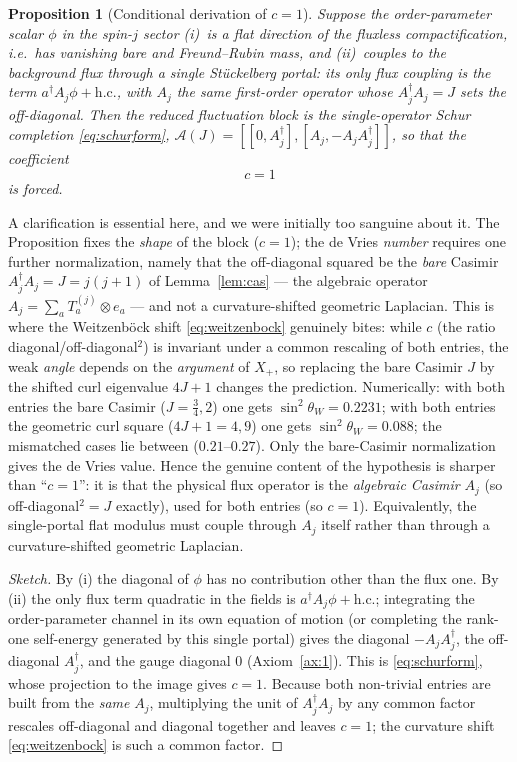 \documentclass[11pt]{article}
\theoremstyle{plain}
\newtheorem{proposition}[theorem]{Proposition}
\theoremstyle{definition}
\newcommand{\cA}{\mathcal{A}}
\newcommand{\sinsq}{\sin^{2}\theta_W}
\begin{document}
\begin{proposition}[Conditional derivation of $c=1$]
\label{prop:cone}
Suppose the order-parameter scalar $\phi$ in the spin-$j$ sector
(i)~is a flat direction of the fluxless compactification, i.e.\ has vanishing
bare and Freund--Rubin mass, and
(ii)~couples to the background flux through a single Stückelberg portal: its
only flux coupling is the term $a^\dagger A_j\phi+\mathrm{h.c.}$, with $A_j$
the same first-order operator whose $A_j^\dagger A_j=J$ sets the off-diagonal.
Then the reduced fluctuation block is the single-operator Schur completion
\eqref{eq:schurform}, $\cA(J)=[[0,A_j^\dagger],[A_j,-A_jA_j^\dagger]]$, so that
the coefficient
\begin{equation}
\boxed{\;c=1\;}
\end{equation}
is forced.
\end{proposition}
A clarification is essential here, and we were initially too sanguine about
it. The Proposition fixes the \emph{shape} of the block ($c=1$); the de Vries
\emph{number} requires one further normalization, namely that the off-diagonal
squared be the \emph{bare} Casimir $A_j^\dagger A_j=J=j(j+1)$ of
Lemma~\ref{lem:cas} --- the algebraic operator $A_j=\sum_aT_a^{(j)}\otimes e_a$
--- and not a curvature-shifted geometric Laplacian. This is where the
Weitzenb\"ock shift \eqref{eq:weitzenbock} genuinely bites: while $c$ (the
ratio diagonal/off-diagonal$^2$) is invariant under a common rescaling of both
entries, the weak \emph{angle} depends on the \emph{argument} of $X_+$, so
replacing the bare Casimir $J$ by the shifted curl eigenvalue $4J+1$ changes
the prediction. Numerically: with both entries the bare Casimir
($J=\tfrac34,2$) one gets $\sinsq=0.2231$; with both entries the geometric
curl square ($4J+1=4,9$) one gets $\sinsq=0.088$; the mismatched cases lie
between ($0.21$--$0.27$). Only the bare-Casimir normalization gives the de
Vries value. Hence the genuine content of the hypothesis is sharper than
``$c=1$'': it is that the physical flux operator is the \emph{algebraic
Casimir} $A_j$ (so off-diagonal$^2=J$ exactly), used for both entries
(so $c=1$). Equivalently, the single-portal flat modulus must couple through
$A_j$ itself rather than through a curvature-shifted geometric Laplacian.
\begin{proof}[Sketch]
By (i) the diagonal of $\phi$ has no contribution other than the flux one. By
(ii) the only flux term quadratic in the fields is
$a^\dagger A_j\phi+\mathrm{h.c.}$; integrating the order-parameter channel in
its own equation of motion (or completing the rank-one self-energy generated
by this single portal) gives the diagonal $-A_jA_j^\dagger$, the off-diagonal
$A_j^\dagger$, and the gauge diagonal $0$ (Axiom~\ref{ax:1}). This is
\eqref{eq:schurform}, whose projection to the image gives $c=1$. Because both
non-trivial entries are built from the \emph{same} $A_j$, multiplying the
unit of $A_j^\dagger A_j$ by any common factor rescales off-diagonal and
diagonal together and leaves $c=1$; the curvature shift
\eqref{eq:weitzenbock} is such a common factor.
\end{proof}
\end{document}
